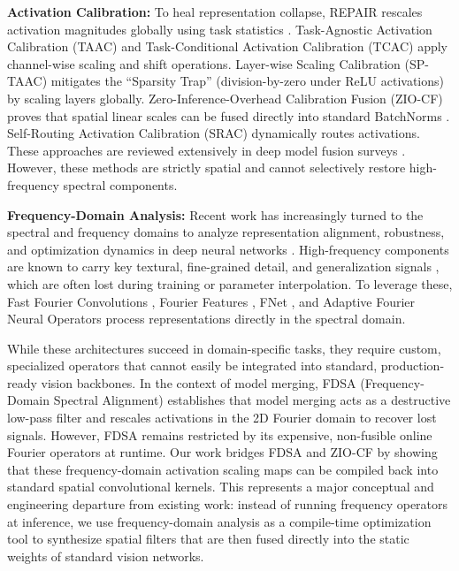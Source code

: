 \documentclass{article}
\theoremstyle{plain}
\theoremstyle{definition}
\theoremstyle{remark}
\begin{document}
\textbf{Activation Calibration:} To heal representation collapse, REPAIR rescales activation magnitudes globally using task statistics \cite{jordan22repair}. Task-Agnostic Activation Calibration (TAAC) \cite{taac2024} and Task-Conditional Activation Calibration (TCAC) \cite{tcac2024} apply channel-wise scaling and shift operations. Layer-wise Scaling Calibration (SP-TAAC) mitigates the ``Sparsity Trap'' (division-by-zero under ReLU activations) by scaling layers globally. Zero-Inference-Overhead Calibration Fusion (ZIO-CF) \cite{ziocf2024} proves that spatial linear scales can be fused directly into standard BatchNorms \cite{ioffe2015batchnorm}. Self-Routing Activation Calibration (SRAC) \cite{srac2025} dynamically routes activations. These approaches are reviewed extensively in deep model fusion surveys \cite{deep_model_fusion_survey2023, model_merging_survey2026}. However, these methods are strictly spatial and cannot selectively restore high-frequency spectral components.

\textbf{Frequency-Domain Analysis:} Recent work has increasingly turned to the spectral and frequency domains to analyze representation alignment, robustness, and optimization dynamics in deep neural networks \cite{fourier1822theorie, oppenheim1999discrete, cooley1965algorithm, yin2019fourier_robustness, wang2020high_freq, rahaman2019spectral_bias, xu2019frequency}. High-frequency components are known to carry key textural, fine-grained detail, and generalization signals \cite{geirhos2018imagenet_texture_bias, wang2020high_freq, ortiz2021hold_me_tight}, which are often lost during training or parameter interpolation. To leverage these, Fast Fourier Convolutions \cite{chi2020fast_fourier_conv}, Fourier Features \cite{tancik2020fourier_features, mildenhall2020nerf}, FNet \cite{bachmann2022fnet}, and Adaptive Fourier Neural Operators \cite{guibas2021adaptive_fno} process representations directly in the spectral domain.

While these architectures succeed in domain-specific tasks, they require custom, specialized operators that cannot easily be integrated into standard, production-ready vision backbones. In the context of model merging, FDSA (Frequency-Domain Spectral Alignment) \cite{anonymous} establishes that model merging acts as a destructive low-pass filter and rescales activations in the 2D Fourier domain to recover lost signals. However, FDSA remains restricted by its expensive, non-fusible online Fourier operators at runtime. Our work bridges FDSA and ZIO-CF by showing that these frequency-domain activation scaling maps can be compiled back into standard spatial convolutional kernels. This represents a major conceptual and engineering departure from existing work: instead of running frequency operators at inference, we use frequency-domain analysis as a compile-time optimization tool to synthesize spatial filters that are then fused directly into the static weights of standard vision networks.
\end{document}
